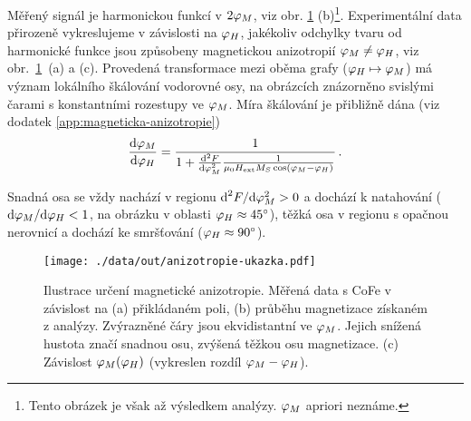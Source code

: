 Měřený signál je harmonickou funkcí v $2\varphi_M$, viz obr. \ref{fig:anizotropie-vizualni} (b)\footnote{Tento obrázek je však až výsledkem analýzy. $\varphi_M$ apriori neznáme.}.
Experimentální data přirozeně vykreslujeme v závislosti na $\varphi_H$, jakékoliv odchylky tvaru od harmonické funkce jsou způsobeny magnetickou anizotropií $\varphi_M\neq\varphi_H$, viz obr.~\ref{fig:anizotropie-vizualni}~(a) a (c).
Provedená transformace mezi oběma grafy ($\varphi_H \mapsto \varphi_M$) má význam lokálního škálování vodorovné osy, na obrázcích znázorněno svislými čarami s konstantními rozestupy ve $\varphi_M$.
Míra škálování je přibližně dána (viz dodatek \ref{app:magneticka-anizotropie})
\begin{equation}
    \frac{\textrm{d}\varphi_M}{\textrm{d}\varphi_H} = \frac{1}{1+\frac{\textrm{d}^2 F}{\textrm{d}\varphi_M^2}\frac{1}{\mu_0 H_\textrm{ext} M_S \cos(\varphi_M-\varphi_H)}} \,.
\end{equation}

Snadná osa se vždy nachází v regionu $\textrm{d}^2F/\textrm{d}\varphi_M^2 > 0$ a dochází k natahování ($\textrm{d}\varphi_M/\textrm{d}\varphi_H < 1$, na obrázku v oblasti $\varphi_H\approx\SI{45}{\degree}$), těžká osa v regionu s opačnou nerovnicí a dochází ke smršťování ($\varphi_H\approx\SI{90}{\degree}$).

\begin{figure}[htbp]
    \centering
    \texttt{[image: ./data/out/anizotropie-ukazka.pdf]}
    \caption{Ilustrace určení magnetické anizotropie. Měřená data s CoFe v závislost na (a) přikládaném poli, (b) průběhu magnetizace získaném z analýzy.
    Zvýrazněné čáry jsou ekvidistantní ve $\varphi_M$. Jejich snížená hustota značí snadnou osu, zvýšená těžkou osu magnetizace. (c) Závislost $\varphi_M(\varphi_H)$ (vykreslen rozdíl $\varphi_M-\varphi_H$).}
    \label{fig:anizotropie-vizualni}
\end{figure}


